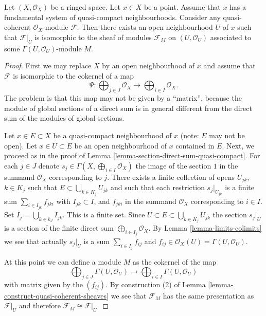 \begin{lemma}
\label{lemma-quasi-coherent-module}
Let $(X, \mathcal{O}_X)$ be a ringed space.
Let $x \in X$ be a point.
Assume that $x$ has a fundamental system of quasi-compact neighbourhoods.
Consider any quasi-coherent $\mathcal{O}_X$-module $\mathcal{F}$.
Then there exists an open neighbourhood $U$ of $x$
such that $\mathcal{F}|_U$ is isomorphic to the
sheaf of modules $\mathcal{F}_M$ on $(U, \mathcal{O}_U)$
associated to some $\Gamma(U, \mathcal{O}_U)$-module $M$.
\end{lemma}

\begin{proof}
First we may replace $X$ by an open neighbourhood of $x$
and assume that $\mathcal{F}$ is isomorphic to the
cokernel of a map
$$
\Psi :
\bigoplus\nolimits_{j \in J}
\mathcal{O}_X
\longrightarrow
\bigoplus\nolimits_{i \in I}
\mathcal{O}_X.
$$
The problem is that this map may not be given by
a ``matrix'', because the module of global sections of a direct sum
is in general different from the direct sum of the modules
of global sections.

\medskip\noindent
Let $x \in E \subset X$ be a quasi-compact
neighbourhood of $x$ (note: $E$ may not be open).
Let $x \in U \subset E$ be an open neighbourhood of
$x$ contained in $E$.
Next, we proceed as in the proof of
Lemma \ref{lemma-section-direct-sum-quasi-compact}.
For each $j \in J$ denote
$s_j \in \Gamma(X, \bigoplus\nolimits_{i \in I} \mathcal{O}_X)$
the image of the section $1$ in the summand $\mathcal{O}_X$
corresponding to $j$. There exists a finite collection of opens
$U_{jk}$, $k \in K_j$ such that $E \subset \bigcup_{k \in K_j} U_{jk}$
and such that each restriction $s_j|_{U_{jk}}$
is a finite sum $\sum_{i \in I_{jk}} f_{jki}$
with $I_{jk} \subset I$, and $f_{jki}$ in the summand
$\mathcal{O}_X$ corresponding to $i \in I$. Set
$I_j = \bigcup_{k \in k_J} I_{jk}$. This is a finite set.
Since $U \subset E \subset \bigcup_{k \in K_j} U_{jk}$
the section $s_j|_U$ is a section of the finite direct sum
$\bigoplus_{i \in I_j} \mathcal{O}_X$.
By Lemma \ref{lemma-limits-colimits}
we see that actually $s_j|_U$ is a sum
$\sum_{i \in I_j} f_{ij}$ and
$f_{ij} \in \mathcal{O}_X(U) = \Gamma(U, \mathcal{O}_U)$.

\medskip\noindent
At this point we can define a module $M$ as the cokernel of the map
$$
\bigoplus\nolimits_{j \in J}
\Gamma(U, \mathcal{O}_U)
\longrightarrow
\bigoplus\nolimits_{i \in I}
\Gamma(U, \mathcal{O}_U)
$$
with matrix given by the $(f_{ij})$. By construction (2) of
Lemma \ref{lemma-construct-quasi-coherent-sheaves} we see that
$\mathcal{F}_M$ has the same presentation as $\mathcal{F}|_U$
and therefore $\mathcal{F}_M \cong \mathcal{F}|_U$.
\end{proof}

